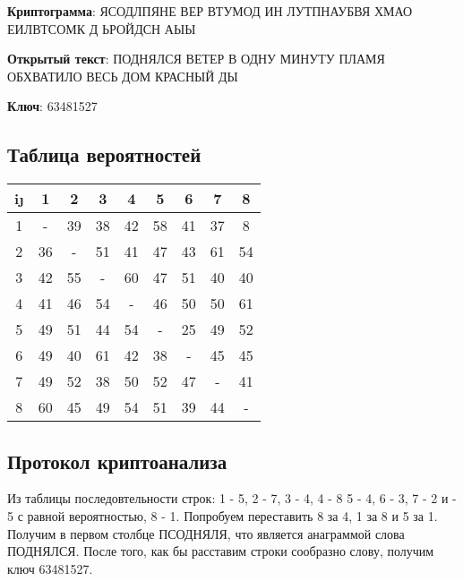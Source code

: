 \documentclass[12pt, a4paper] {ncc}
\begin{document}
\textbf{Криптограмма}:
ЯСОДЛПЯНЕ ВЕР ВТУМОД  ИН ЛУТПНАУБВЯ ХМАО ЕИЛВТСОМК Д ЬРОЙДСН АЫЫ

\textbf{Открытый текст}:
ПОДНЯЛСЯ ВЕТЕР В ОДНУ МИНУТУ ПЛАМЯ ОБХВАТИЛО ВЕСЬ ДОМ КРАСНЫЙ ДЫ

\textbf{Ключ}:
63481527

\subsection{Таблица вероятностей}
	\begin{tabular}{|c|c|c|c|c|c|c|c|c|}
		\hline
		i\j & 1 & 2 & 3 & 4 & 5 & 6 & 7 & 8 \\ \hline
		1   & - & 39 & 38 & 42 & 58 & 41 & 37 & 8 \\ \hline
		2   & 36 & - & 51 & 41 & 47 & 43 & 61 & 54 \\ \hline
		3   & 42 & 55 & - & 60 & 47 & 51 & 40 & 40 \\ \hline
		4   & 41 & 46 & 54 & - & 46 & 50 & 50 & 61 \\ \hline
		5   & 49 & 51 & 44 & 54 & - & 25 & 49 & 52 \\ \hline
		6   & 49 & 40 & 61 & 42 & 38 & - & 45 & 45 \\ \hline
		7   & 49 & 52 & 38 & 50 & 52 & 47 & - & 41 \\ \hline
		8   & 60 & 45 & 49 & 54 & 51 & 39 & 44 & - \\ \hline
	\end{tabular}

\subsection{Протокол криптоанализа}
	Из таблицы последовтельности строк: 1 - 5, 2 - 7, 3 - 4, 4 - 8
	5 - 4, 6 - 3, 7 - 2 и - 5 с равной вероятностью, 8 - 1.
    Попробуем переставить 8 за 4, 1 за 8 и 5 за 1. Получим в первом
	столбце ПСОДНЯЛЯ, что является анаграммой слова ПОДНЯЛСЯ. После
	того, как бы расставим строки сообразно слову, получим ключ 63481527.
	
\end{document}
